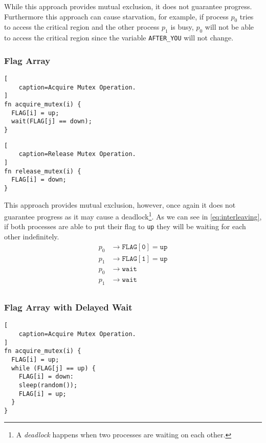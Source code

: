 While this approach provides mutual exclusion, it does not guarantee progress.
Furthermore this approach can cause starvation, for example,
if process $p_0$ tries to access the critical region and the other process $p_1$ is busy,
$p_0$ will not be able to access the critical region since the variable \texttt{AFTER\_YOU} will not change.

\subsubsection{Flag Array}

\begin{lstlisting}[
    caption=Acquire Mutex Operation.
]
fn acquire_mutex(i) {
  FLAG[i] = up;
  wait(FLAG[j] == down);
}
\end{lstlisting}

\begin{lstlisting}[
    caption=Release Mutex Operation.
]
fn release_mutex(i) {
  FLAG[i] = down;
}
\end{lstlisting}

This approach provides mutual exclusion, however, once again it does not guarantee progress as it may cause a deadlock\footnote{A \textit{deadlock} happens when two processes are waiting on each other.}.
As we can see in \autoref{eq:interleaving}, if both processes are able to put their flag to \texttt{up} they will be waiting for each other indefinitely.
\begin{equation}\label{eq:interleaving}
    \begin{split}
        p_0 & \rightarrow \mathtt{FLAG[0] = up}\\
        p_1 & \rightarrow \mathtt{FLAG[1] = up}\\
        p_0 & \rightarrow \mathtt{wait}\\
        p_1 & \rightarrow \mathtt{wait}\\
    \end{split}
\end{equation}

\subsubsection{Flag Array with Delayed Wait}

\begin{lstlisting}[
    caption=Acquire Mutex Operation.
]
fn acquire_mutex(i) {
  FLAG[i] = up;
  while (FLAG[j] == up) {
    FLAG[i] = down:
    sleep(random());
    FLAG[i] = up;
  }
}
\end{lstlisting}

